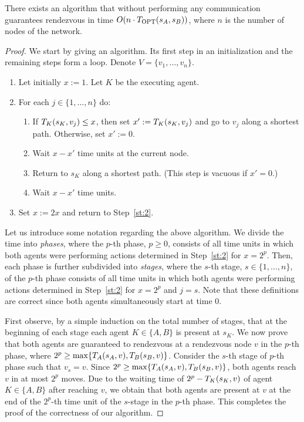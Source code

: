 \documentclass{llncs}
\newcommand{\Topt}[2]{T_{{\scriptsize \textup{OPT}}}(#1,#2)}
\newcommand{\dist}[4][]{\if!#1!T_{#2}(#3,#4)\else T_{#2}(#3,#4,#1)\fi}
\newcommand{\startpos}[1]{s_{#1}}
\newcommand{\starta}{\startpos{A}}
\newcommand{\startb}{\startpos{B}}
\newcommand{\agentVariable}{K}
\begin{document}
\begin{theorem} \label{thm:arbitrary+no-comm}
There exists an algorithm that without performing any communication guarantees rendezvous in time $O(n\cdot\Topt{\starta}{\startb})$, where $n$ is the number of nodes of the network.
\end{theorem}
\begin{proof}
We start by giving an algorithm.
Its first step in an initialization and the remaining steps form a loop.
Denote $V=\{v_1,\ldots,v_n\}$.
\begin{enumerate}
 \item\label{st:1} Let initially $x:=1$. Let ${\agentVariable}$ be the executing agent.
 \item\label{st:2} For each $j\in\{1,\ldots,n\}$ do:
   \begin{enumerate}[label={\normalfont \ref{st:2}.\arabic*.}]
    \item If $\dist{\agentVariable}{\startpos{{\agentVariable}}}{v_j}\leq x$, then set $x':=\dist{\agentVariable}{\startpos{\agentVariable}}{v_j}$ and go to $v_j$ along a shortest path. Otherwise, set $x':=0$.
    \item Wait $x-x'$ time units at the current node.
    \item Return to $\startpos{{\agentVariable}}$ along a shortest path. (This step is vacuous if $x'=0$.)
    \item Wait $x-x'$ time units.
   \end{enumerate}
 \item\label{st:3} Set $x:= 2x$ and return to Step~\ref{st:2}.
\end{enumerate}

Let us introduce some notation regarding the above algorithm.
We divide the time into \emph{phases}, where the $p$-th phase, $p\geq 0$, consists of all time units in which both agents were performing actions determined in Step~\ref{st:2} for $x=2^{p}$.
Then, each phase is further subdivided into \emph{stages}, where the $s$-th stage, $s\in\{1,\ldots,n\}$, of the $p$-th phase consists of all time units in which both agents were performing actions determined in Step~\ref{st:2} for $x=2^{p}$ and $j=s$.
Note that these definitions are correct since both agents simultaneously start at time $0$.

First observe, by a simple induction on the total number of stages, that at the beginning of each stage each agent ${\agentVariable}\in\{A,B\}$ is present at $\startpos{{\agentVariable}}$.
We now prove that both agents are guaranteed to rendezvous at a rendezvous node $v$ in the $p$-th phase, where $2^p\geq \max\{\dist{A}{\starta}{v},\dist{B}{\startb}{v}\}$.
Consider the $s$-th stage of $p$-th phase such that $v_s=v$.
Since $2^p\geq \max\{\dist{A}{\starta}{v},\dist{B}{\startb}{v}\}$, both agents reach $v$ in at most $2^p$ moves.
Due to the waiting time of $2^p-\dist{{\agentVariable}}{\startpos{{\agentVariable}}}{v}$ of agent ${\agentVariable}\in\{A,B\}$ after reaching $v$, we obtain that both agents are present at $v$ at the end of the $2^p$-th time unit of the $s$-stage in the $p$-th phase.
This completes the proof of the correctness of our algorithm.


\end{proof}
\end{document}
